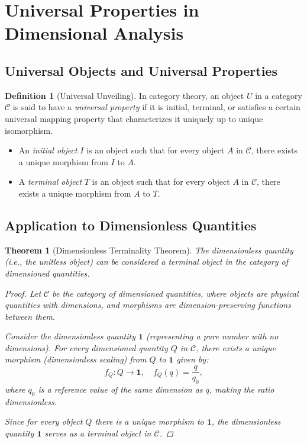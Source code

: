 \documentclass{article}
\newtheorem{theorem}{Theorem}[section]
\theoremstyle{definition}
\newtheorem{definition}{Definition}[section]
\theoremstyle{remark}
\begin{document}
	\section{Universal Properties in Dimensional Analysis}
	
	\subsection{Universal Objects and Universal Properties}
	
	\begin{definition}[Universal Unveiling]
		In category theory, an object $U$ in a category $\mathcal{C}$ is said to have a \emph{universal property} if it is initial, terminal, or satisfies a certain universal mapping property that characterizes it uniquely up to unique isomorphism.
		
		\begin{itemize}
			\item An \emph{initial object} $I$ is an object such that for every object $A$ in $\mathcal{C}$, there exists a unique morphism from $I$ to $A$.
			\item A \emph{terminal object} $T$ is an object such that for every object $A$ in $\mathcal{C}$, there exists a unique morphism from $A$ to $T$.
		\end{itemize}
	\end{definition}
	
	\subsection{Application to Dimensionless Quantities}
	
	\begin{theorem}[Dimensionless Terminality Theorem]
		The dimensionless quantity (i.e., the unitless object) can be considered a terminal object in the category of dimensioned quantities.
		
		\begin{proof}
			Let $\mathcal{C}$ be the category of dimensioned quantities, where objects are physical quantities with dimensions, and morphisms are dimension-preserving functions between them.
			
			Consider the dimensionless quantity $\mathbf{1}$ (representing a pure number with no dimensions). For every dimensioned quantity $Q$ in $\mathcal{C}$, there exists a unique morphism (dimensionless scaling) from $Q$ to $\mathbf{1}$ given by:
			\[
			f_Q: Q \rightarrow \mathbf{1}, \quad f_Q(q) = \dfrac{q}{q_0},
			\]
			where $q_0$ is a reference value of the same dimension as $q$, making the ratio dimensionless.
			
			Since for every object $Q$ there is a unique morphism to $\mathbf{1}$, the dimensionless quantity $\mathbf{1}$ serves as a terminal object in $\mathcal{C}$.
		\end{proof}
	\end{theorem}
	
\end{document}
